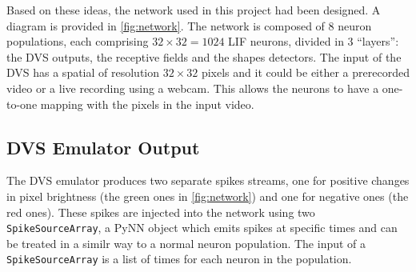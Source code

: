 Based on these ideas, the network used in this project had been designed. A diagram is provided in \cref{fig:network}. The network is composed of 8 neuron populations, each comprising  $32 \times 32 = 1024$ LIF neurons, divided in 3 ``layers'': the DVS outputs, the receptive fields and the shapes detectors. The input of the DVS has a spatial of resolution $32 \times 32$ pixels and it could be either a prerecorded video or a live recording using a webcam. This allows the neurons to have a one-to-one mapping with the pixels in the input video. 

\subsection{DVS Emulator Output}
The DVS emulator produces two separate spikes streams, one for positive changes in pixel brightness (the green ones in \cref{fig:network}) and one for negative ones (the red ones). These spikes are injected into the network using two \texttt{SpikeSourceArray}, a PyNN object which emits spikes at specific times and can be treated in a similr way to a normal neuron population. The input of a \texttt{SpikeSourceArray} is a list of times for each neuron in the population. 

